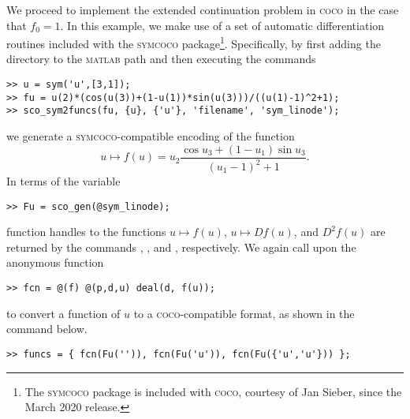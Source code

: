 We proceed to implement the extended continuation problem in \textsc{coco} in the case that $f_0=1$. In this example, we make use of a set of automatic differentiation routines included with the \textsc{symcoco} package\footnote{The \textsc{symcoco} package is included with \textsc{coco}, courtesy of Jan Sieber, since the March 2020 release.}. Specifically, by first adding the  directory to the \textsc{matlab} path and then executing the commands
\begin{lstlisting}[language=coco-highlight]
>> u = sym('u',[3,1]);
>> fu = u(2)*(cos(u(3))+(1-u(1))*sin(u(3)))/((u(1)-1)^2+1);
>> sco_sym2funcs(fu, {u}, {'u'}, 'filename', 'sym_linode');
\end{lstlisting}
we generate a \textsc{symcoco}-compatible encoding of the function
\begin{equation}
u\mapsto f(u)=u_2\frac{\cos u_3+(1-u_1)\sin u_3}{(u_1-1)^2+1}.
\end{equation}
In terms of the variable
\begin{lstlisting}[language=coco-highlight]
>> Fu = sco_gen(@sym_linode);
\end{lstlisting}
function handles to the functions $u\mapsto f(u)$, $u\mapsto Df(u)$, and $D^2f(u)$ are returned by the commands , , and , respectively. We again call upon the anonymous function
\begin{lstlisting}[language=coco-highlight]
>> fcn = @(f) @(p,d,u) deal(d, f(u));
\end{lstlisting}
to convert a function of $u$ to a \textsc{coco}-compatible format, as shown in the command below.
\begin{lstlisting}[language=coco-highlight]
>> funcs = { fcn(Fu('')), fcn(Fu('u')), fcn(Fu({'u','u'})) };
\end{lstlisting}

